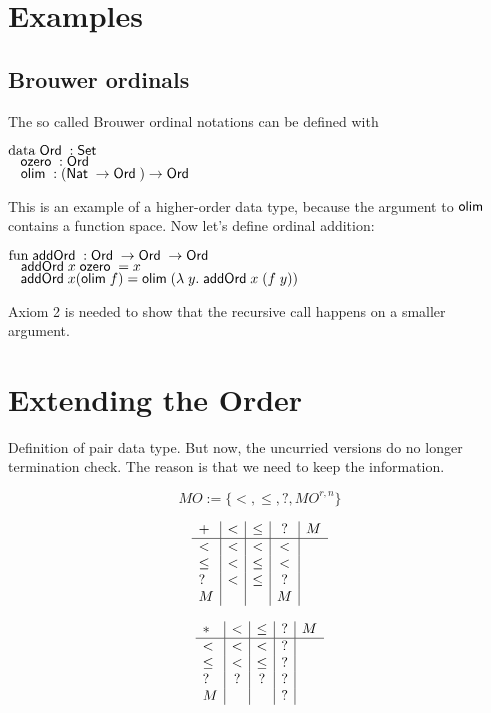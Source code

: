 \section{Examples}

\subsection{Brouwer ordinals}
The so called Brouwer ordinal notations can be defined with
\begin{bsp}
$\mathrm{data}\; \mathsf{Ord}\; : \mathsf{Set}$ \\
$\hspace*{3mm} \mathsf{ozero}\; : \mathsf{Ord}\; $\\
$\hspace*{3mm} \mathsf{olim}\; : (\mathsf{Nat}\; \rightarrow \mathsf{Ord}\; ) \rightarrow \mathsf{Ord}\; $
\end{bsp}
This is an example of a higher-order data type, because the argument to $\mathsf{olim}\;$ contains a function space.
Now let's define ordinal addition:
\begin{bsp}
$\mathrm{fun}\; \mathsf{addOrd}\; : \mathsf{Ord}\; \rightarrow \mathsf{Ord}\; \rightarrow \mathsf{Ord}\;$\\
$\hspace*{3mm} \mathsf{addOrd}\; x \; \mathsf{ozero}\; = x $\\
$\hspace*{3mm} \mathsf{addOrd}\; x (\mathsf{olim}\; f) = \mathsf{olim}\; ( \lambda\; y .\; \mathsf{addOrd}\;  x \; (f \; y))  $
\end{bsp}
Axiom 2 is needed to show that the recursive call happens on a smaller argument.
\section{Extending the Order}
Definition of pair data type.
But now, the uncurried versions do no longer termination check.
The reason is that we need to keep the information.
\begin{definition}[MOrder]
\[ MO := \{ < , \leq , ? , MO^{r,n}\} \]
\end{definition}

\begin{definition}
\[
\begin{array}{l | c |c | c | c}

 +    &  <   &  \leq   &  ? & M \\
 \hline 
 <    &  <   & <       &  < &  \\
 \leq &  <   & \leq    &  < &  \\
 ?    &  <   & \leq    &  ? &  \\
 M    &      &         &  M &  
\end{array}
\]

\end{definition}


\begin{definition}
\[
\begin{array}{l | c |c | c| c }
 *    &  <  &  \leq &   ? & M \\
\hline
  <   & <    & <    &   ? &   \\
 \leq & <    & \leq &   ? &   \\
 ?    & ?    & ?    &   ? &   \\
 M    &      &      &   ? &
\end{array}
\]
\end{definition}

